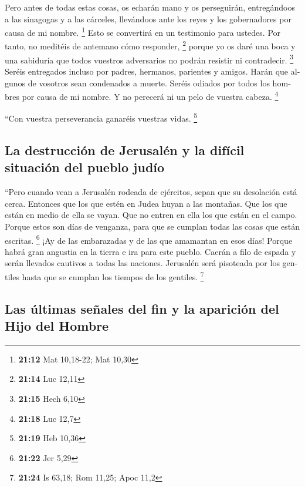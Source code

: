 \begin{paracol}{2}
\begin{otherlanguage}{english}
 Pero antes de todas estas cosas, os echarán mano y os
perseguirán, entregándoos a las sinagogas y a las cárceles, llevándoos
ante los reyes y los gobernadores por causa de mi nombre. \footnote{\textbf{21:12}
  Mat 10,18-22; Mat 10,30}  Esto se convertirá en un
testimonio para ustedes.  Por tanto, no meditéis de
antemano cómo responder, \footnote{\textbf{21:14} Luc 12,11}
 porque yo os daré una boca y una sabiduría que todos
vuestros adversarios no podrán resistir ni contradecir. \footnote{\textbf{21:15}
  Hech 6,10}  Seréis entregados incluso por padres,
hermanos, parientes y amigos. Harán que algunos de vosotros sean
condenados a muerte.  Seréis odiados por todos los
hombres por causa de mi nombre.  Y no perecerá ni un pelo
de vuestra cabeza. \footnote{\textbf{21:18} Luc 12,7}

 ``Con vuestra perseverancia ganaréis vuestras vidas.
\footnote{\textbf{21:19} Heb 10,36}

\hypertarget{la-destrucciuxf3n-de-jerusaluxe9n-y-la-difuxedcil-situaciuxf3n-del-pueblo-juduxedo}{%
\subsection{La destrucción de Jerusalén y la difícil situación del
pueblo
judío}\label{la-destrucciuxf3n-de-jerusaluxe9n-y-la-difuxedcil-situaciuxf3n-del-pueblo-juduxedo}}

 ``Pero cuando vean a Jerusalén rodeada de ejércitos,
sepan que su desolación está cerca.  Entonces que los que
estén en Judea huyan a las montañas. Que los que están en medio de ella
se vayan. Que no entren en ella los que están en el campo.
 Porque estos son días de venganza, para que se cumplan
todas las cosas que están escritas. \footnote{\textbf{21:22} Jer 5,29}
 ¡Ay de las embarazadas y de las que amamantan en esos
días! Porque habrá gran angustia en la tierra e ira para este pueblo.
 Caerán a filo de espada y serán llevados cautivos a
todas las naciones. Jerusalén será pisoteada por los gentiles hasta que
se cumplan los tiempos de los gentiles. \footnote{\textbf{21:24} Is
  63,18; Rom 11,25; Apoc 11,2}

\hypertarget{las-uxfaltimas-seuxf1ales-del-fin-y-la-apariciuxf3n-del-hijo-del-hombre}{%
\subsection{Las últimas señales del fin y la aparición del Hijo del
Hombre}\label{las-uxfaltimas-seuxf1ales-del-fin-y-la-apariciuxf3n-del-hijo-del-hombre}}


\end{otherlanguage}
\end{paracol}
